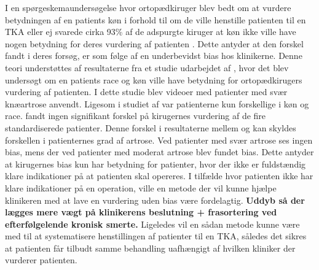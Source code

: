 I en spørgeskemaundersøgelse hvor ortopædkiruger blev bedt om at vurdere betydningen af en patients køn i forhold til om de ville henstille patienten til en TKA eller ej svarede cirka 93\% af de adspurgte kiruger at køn ikke ville have nogen betydning for deres vurdering af patienten \citep{wright1995}. Dette antyder at den forskel \cite{borkhoff2008} fandt i deres forsøg, er som følge af en underbevidst bias hos klinikerne. Denne teori understøttes af resultaterne fra et studie udarbejdet af \cite{dy2014}, hvor det blev undersøgt om en patients race og køn ville have betydning for ortopædkirugers vurdering af patienten. I dette studie blev videoer med patienter med svær knæartrose anvendt. Ligesom i studiet af \cite{borkhoff2008} var patienterne kun forskellige i køn og race. \cite{dy2014} fandt ingen signifikant forskel på kirugernes vurdering af de fire standardiserede patienter. Denne forskel i resultaterne mellem \cite{borkhoff2008} og \cite{dy2014} kan skyldes forskellen i patienternes grad af artrose. Ved patienter med svær artrose ses ingen bias, mens der ved patienter med moderat artrose blev fundet bias. Dette antyder at kirugernes bias kun har betydning for patienter, hvor der ikke er fuldstændig klare indikationer på at patienten skal opereres. I tilfælde hvor patienten ikke har klare indikationer på en operation, ville en metode der vil kunne hjælpe klinikeren med at lave en vurdering uden bias være fordelagtig. \textbf{Uddyb så der lægges mere vægt på klinikerens beslutning + frasortering ved efterfølgelende kronisk smerte.} Ligeledes vil en sådan metode kunne være med til at systematisere henstillingen af patienter til en TKA, således det sikres at patienten får tilbudt samme behandling uafhængigt af hvilken kliniker der vurderer patienten. 

   
